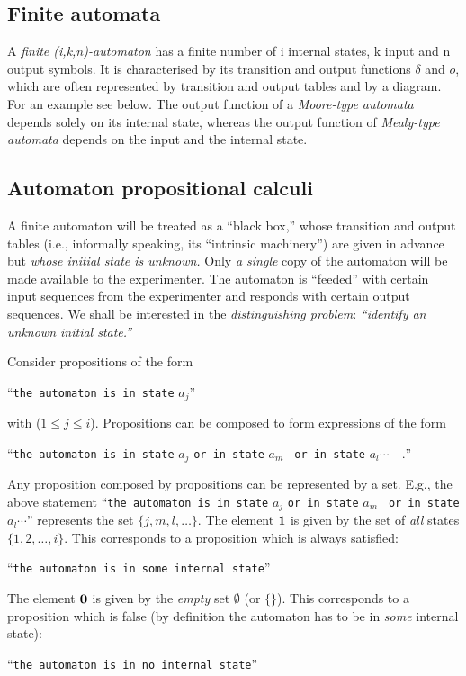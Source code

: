 \documentclass{article}
\begin{document}
\subsection{Finite automata}
A {\em finite  (i,k,n)-automaton} has a finite number of i
 internal states, k input and n output symbols. It is characterised by
 its transition and output functions $\delta$ and $o$, which are often
represented by transition and output tables and by a diagram.
For an example see below.
 The output function
 of a {\em Moore-type automata}
depends solely on its internal state, whereas the output function of
 {\em Mealy-type automata}
 depends  on the input and the internal state.


\subsection{Automaton propositional calculi}
A finite automaton will be treated as a ``black box,'' whose transition
and output
 tables (i.e., informally speaking, its ``intrinsic machinery'') are
given in advance but
{\em whose initial state is unknown.}
Only {\em a single} copy of the automaton will be made available to the
experimenter.
 The  automaton is ``feeded'' with certain input sequences from
 the experimenter and responds with certain output sequences.
We shall be interested in
  the {\em distinguishing problem}:
{\em ``identify an unknown initial
 state.''}


Consider propositions of the form
 \begin{center}
 ``{\tt the automaton is in state} $a_j$''
 \end{center}
 with
 ($1\le j\le i$).
 Propositions can be composed to form expressions of the form
 \begin{center}
 ``{\tt the automaton is in state} $a_j$ {\tt or in state} $a_m$ {\tt
or  in state} $a_l  \cdots \quad .$''
 \end{center}
 Any proposition composed by propositions can be represented by a set.
 E.g., the above statement
 ``{\tt the automaton is in  state} $a_j$ {\tt or in state} $a_m$ {\tt
or  in state} $a_l  \cdots $''
 represents the set $\{
j,m,l,\ldots
\}$.
 The
 element ${\bf 1}$ is given by the set of {\em all} states $\{ 1,
 2,\ldots ,i\}$.
This corresponds to a proposition which is always satisfied:
 \begin{center}
 ``{\tt the automaton is in some internal state}''
 \end{center}


 The
 element ${\bf 0}$ is given by the {\em empty} set
$\emptyset$ (or $\{
\}$).
This corresponds to a proposition which is false (by definition the
automaton has to be in {\em some} internal state):
 \begin{center}
 ``{\tt the automaton is in no internal state}''
 \end{center}
\end{document}
